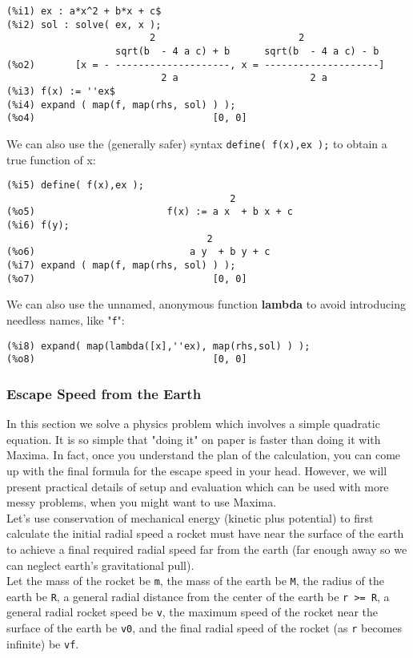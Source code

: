 \documentclass[12pt]{article}
\begin{document}
\small
\begin{verbatim}
(%i1) ex : a*x^2 + b*x + c$
(%i2) sol : solve( ex, x );
                         2                         2
                   sqrt(b  - 4 a c) + b      sqrt(b  - 4 a c) - b
(%o2)       [x = - --------------------, x = --------------------]
                           2 a                       2 a
(%i3) f(x) := ''ex$
(%i4) expand ( map(f, map(rhs, sol) ) ); 
(%o4)                               [0, 0]
\end{verbatim}
\normalsize
We can also use the (generally safer) syntax \verb|define( f(x),ex );| to
  obtain a true function of x:
\small
\begin{verbatim}
(%i5) define( f(x),ex );
                                       2
(%o5)                       f(x) := a x  + b x + c
(%i6) f(y);
                                   2
(%o6)                           a y  + b y + c
(%i7) expand ( map(f, map(rhs, sol) ) );
(%o7)                               [0, 0]
\end{verbatim}
\normalsize
  
We can also use the unnamed, anonymous function \textbf{lambda} to avoid 
  introducing needless names, like "\verb|f|":
\small
\begin{verbatim}
(%i8) expand( map(lambda([x],''ex), map(rhs,sol) ) );
(%o8)                               [0, 0]
\end{verbatim}
\normalsize

  
  
 \subsubsection{Escape Speed from the Earth}
In this section we solve a physics problem which involves a simple quadratic equation.
It is so simple that "doing it" on paper is faster than doing it with Maxima.
In fact, once you understand the plan of the calculation, you can come up with the final
  formula for the escape speed in your head.
However, we will present practical details of setup and evaluation which can be used with
  more messy problems, when you might want to use Maxima.\\
  
Let's use conservation of mechanical energy (kinetic plus potential) to first calculate the 
  initial radial speed a rocket must have near the surface of the earth to achieve a final
  required radial speed far from the earth (far enough away so we can neglect earth's gravitational
  pull).\\
Let the mass of the rocket be \verb|m|, the mass of the earth be \verb|M|, the radius of
  the earth be \verb|R|, a general radial distance from the center of the
  earth be \verb|r >= R|, a general radial rocket speed be \verb|v|, the maximum speed of
  the rocket near the surface of the earth be \verb|v0|, and the final radial speed of
  the rocket (as \verb|r| becomes infinite) be \verb|vf|.
  
\end{document}
